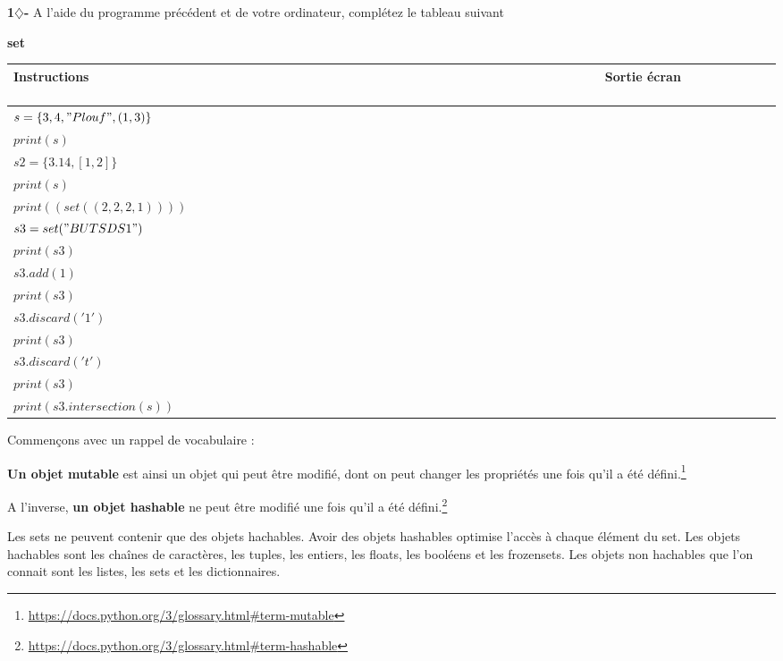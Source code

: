 \begin{tcolorbox}[lefttitle=2cm, colframe=gray!75!black, title= \textbf{Exercice}]
\textbf{1$\diamondsuit$-}
A l'aide du programme précédent et de votre ordinateur, complétez le tableau suivant


\textbf{set}

\begin{tabular}{|l|c|}
    \hline   Instructions &  ~~~~~~~~~~~~~~~~~~~~~~~~~~~~~~~~~~~~~~~~~~~~Sortie écran ~~~~~~~~~~~~~~~~~~~~~~~~~~~~~~~~~~~~~~~~~~~~\\\hline
     $s = \{3, 4, "Plouf", (1, 3)\}$ & \\
     $print(s)$ &  \\\hline
      $s2 = \{3.14, [1, 2]\}$ & \\
     $print(s)$ &  \\\hline
       $print((set((2, 2, 2, 1))))$& \\\hline
      $s3 = set("BUT SD S1")$ &  \\ 
       $print(s3)$&\\\hline
      $s3.add(1)$ &  \\ 
       $print(s3)$&\\\hline
      $s3.discard('1')$ &  \\ 
       $print(s3)$&\\\hline
      $s3.discard('t')$ & \\ 
       $print(s3)$&\\\hline
      $print(s3.intersection(s))$&\\\hline
\end{tabular}


\end{tcolorbox}


\begin{tcolorbox}[lefttitle=2cm, colframe=gray!75!blue, title= \textbf{Tip for Code 5 : Etre ou ne pas être (hashable)}]

Commençons avec un rappel de vocabulaire :

\textbf{Un objet mutable} est ainsi un objet qui peut être modifié, dont on peut changer les propriétés une fois qu’il a été 
défini.\footnote{\url{https://docs.python.org/3/glossary.html\#term-mutable}}


A l'inverse, \textbf{un objet hashable} ne peut être modifié une fois qu’il a été 
défini.\footnote{\url{https://docs.python.org/3/glossary.html\#term-hashable}}

Les sets ne peuvent contenir que des objets hachables. Avoir des objets hashables optimise l'accès à chaque élément du set. Les objets hachables sont les chaînes de caractères, les tuples, les entiers, les floats, les booléens et les frozensets. Les objets non hachables que l'on connait sont les listes, les sets et les dictionnaires. 

\end{tcolorbox}






